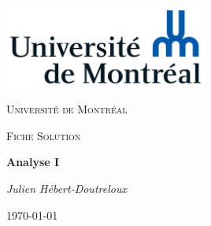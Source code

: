 \documentclass{article}[babel]
\begin{document}
	\begin{titlepage}
		\centering
		\includegraphics[width=0.5\textwidth]{Universite_de_Montreal_logo}\par\vspace{1cm}
		{\scshape\LARGE Université de Montréal\par}
		\vspace{1cm}
		{\scshape\Large Fiche Solution\par}
		\vspace{1.5cm}
		{\huge\bfseries Analyse I\par}
		\vspace{2cm}
		{\Large\itshape Julien Hébert-Doutreloux\par}
		\vfill
		\vfill
		{\large \today\par}
	\end{titlepage}
		\setcounter{page}{2}
		
		\setcounter{subsection}{0}
	
\end{document}
